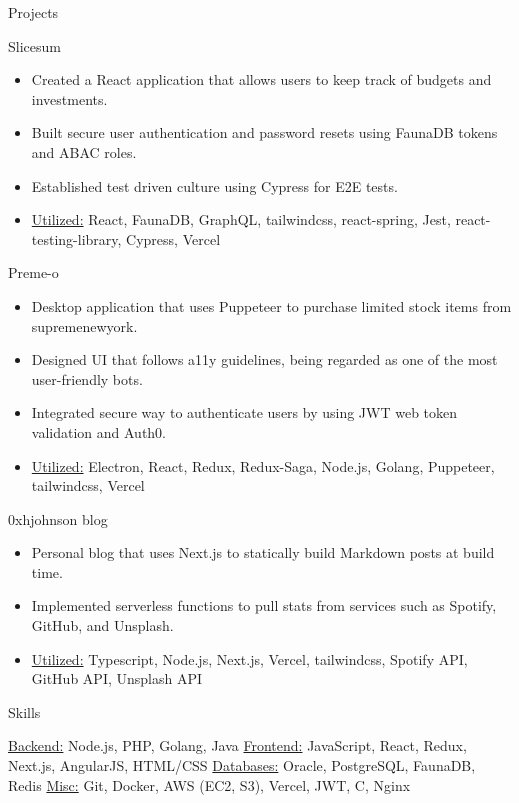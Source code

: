 \documentclass[calibri]{mcdowellcv}
\begin{document}
	\begin{cvsection}{Projects}
		\begin{cvsubsection}{Slicesum}{}{}
			\begin{itemize}
        \item Created a React application that allows users to keep track of budgets and investments.
        \item Built secure user authentication and password resets using FaunaDB tokens and ABAC roles.
        \item Established test driven culture using Cypress for E2E tests.
				\item \underline{Utilized:} React, FaunaDB, GraphQL, tailwindcss, react-spring, Jest, react-testing-library, Cypress, Vercel
    	\end{itemize}
		\end{cvsubsection}

		\begin{cvsubsection}{Preme-o}{}{}
			\begin{itemize}
        \item Desktop application that uses Puppeteer to purchase limited stock items from supremenewyork.
        \item Designed UI that follows a11y guidelines, being regarded as one of the most user-friendly bots.
        \item Integrated secure way to authenticate users by using JWT web token validation and Auth0.
				\item \underline{Utilized:} Electron, React, Redux, Redux-Saga, Node.js, Golang, Puppeteer, tailwindcss, Vercel
    	\end{itemize}
		\end{cvsubsection}

		\begin{cvsubsection}{0xhjohnson blog}{}{}
			\begin{itemize}
        \item Personal blog that uses Next.js to statically build Markdown posts at build time.
        \item Implemented serverless functions to pull stats from services such as Spotify, GitHub, and Unsplash.
				\item \underline{Utilized:} Typescript, Node.js, Next.js, Vercel, tailwindcss, Spotify API, GitHub API, Unsplash API
    	\end{itemize}
		\end{cvsubsection}
	\end{cvsection}
	
	\begin{cvsection}{Skills}
		\begin{cvsubsection}{}{}{}	
				\underline{Backend:} Node.js, PHP, Golang, Java
				\hfill
				\underline{Frontend:} JavaScript, React, Redux, Next.js, AngularJS, HTML/CSS
				\underline{Databases:} Oracle, PostgreSQL, FaunaDB, Redis
				\hfill
				\underline{Misc:} Git, Docker, AWS (EC2, S3), Vercel, JWT, C, Nginx
		\end{cvsubsection}
	\end{cvsection}
	
\end{document}
